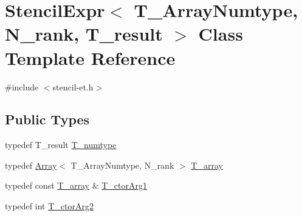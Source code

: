 \hypertarget{classStencilExpr}{}\section{Stencil\+Expr$<$ T\+\_\+\+Array\+Numtype, N\+\_\+rank, T\+\_\+result $>$ Class Template Reference}
\label{classStencilExpr}


{\ttfamily \#include $<$stencil-\/et.\+h$>$}

\subsection*{Public Types}
\begin{DoxyCompactItemize}
\item 
typedef T\+\_\+result \hyperlink{classStencilExpr_a82c2e4135f1f023270a530fd3d08d5c3}{T\+\_\+numtype}
\item 
typedef \hyperlink{classArray}{Array}$<$ T\+\_\+\+Array\+Numtype, N\+\_\+rank $>$ \hyperlink{classStencilExpr_a9a5d9a852bd72220519a7042927dc7c1}{T\+\_\+array}
\item 
typedef const \hyperlink{classStencilExpr_a9a5d9a852bd72220519a7042927dc7c1}{T\+\_\+array} \& \hyperlink{classStencilExpr_a7b74609a8262d29ae782a68e38d5fcbb}{T\+\_\+ctor\+Arg1}
\item 
typedef int \hyperlink{classStencilExpr_a2a9f30c710f6dece525d1890808b68f2}{T\+\_\+ctor\+Arg2}
\end{DoxyCompactItemize}
